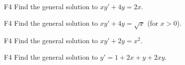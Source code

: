 \begin{problem}{F4}
Find the general solution to \(xy' + 4y = 2x\).
\end{problem}

\begin{problem}{F4}
Find the general solution to \(xy' + 4y = \sqrt{x}\) (for \(x>0\)).
\end{problem}

\begin{problem}{F4}
Find the general solution to \(xy' + 2y = x^2\).
\end{problem}

\begin{problem}{F4}
Find the general solution to \(y' = 1 + 2x + y + 2xy\).
\end{problem}

